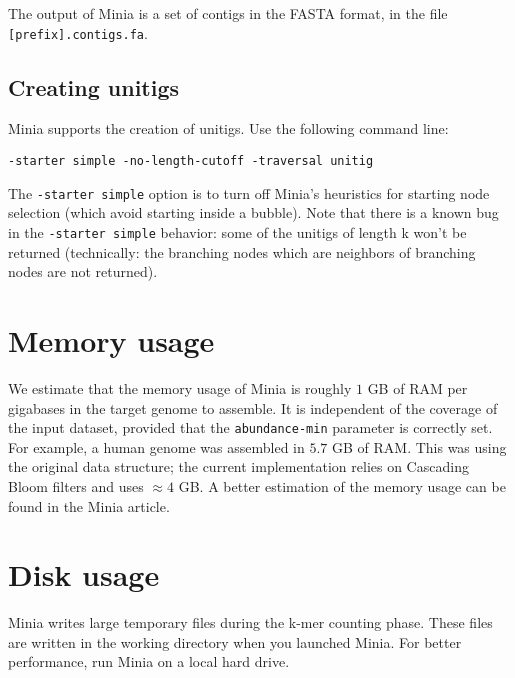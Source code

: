 \documentclass[a4paper]{article}
\begin{document}
The output of Minia is a set of contigs in the FASTA format, in the file \verb+[prefix].contigs.fa+. 

\subsection*{Creating unitigs}

Minia supports the creation of unitigs. Use the following command line: 
\begin{verbatim}
-starter simple -no-length-cutoff -traversal unitig
\end{verbatim}

The \verb+-starter simple+ option is to turn off Minia's heuristics for starting node selection (which avoid starting inside a bubble).
Note that there is a known bug in the \verb+-starter simple+ behavior: some of the unitigs of length k won't be returned (technically: the branching nodes which are neighbors of branching nodes are not returned).

\section{Memory usage}

We estimate that the memory usage of Minia is roughly $1$ GB of RAM per gigabases in the target genome to assemble. It is independent of the coverage of the input dataset, provided that the \verb!abundance-min! parameter is correctly set. For example, a human genome was assembled in $5.7$ GB of RAM. This was using the original data structure; the current implementation relies on Cascading Bloom filters and uses $\approx 4$ GB. A better estimation of the memory usage can be found in the Minia article.

\section{Disk usage}

Minia writes large temporary files during the k-mer counting phase. These files are written in the working directory when you launched Minia. For better performance, run Minia on a local hard drive. 
\end{document}
